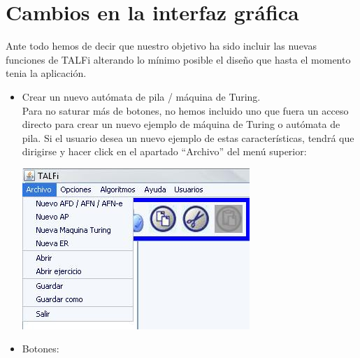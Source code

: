 \documentclass[12pt,a4paper,spanish]{book}
\begin{document}
\section{Cambios en la interfaz gr\'afica}
Ante todo hemos de decir que nuestro objetivo ha sido incluir las nuevas funciones de TALFi alterando lo m\'inimo posible el dise\~no que hasta el momento tenia la aplicaci\'on.\\
\begin{itemize}
\item Crear un nuevo aut\'omata de pila / m\'aquina de Turing.\\

Para no saturar m\'as de botones, no hemos incluido uno que fuera un acceso directo para crear un nuevo ejemplo de m\'aquina de Turing o aut\'omata de pila. Si el usuario desea un nuevo ejemplo de estas caracter\'isticas, tendr\'a que dirigirse y hacer click en el apartado ``Archivo'' del men\'u superior:\\
\begin{center}
\includegraphics{roci2.jpg}
\end{center}
\item Botones:\\


\end{itemize}
\end{document}
